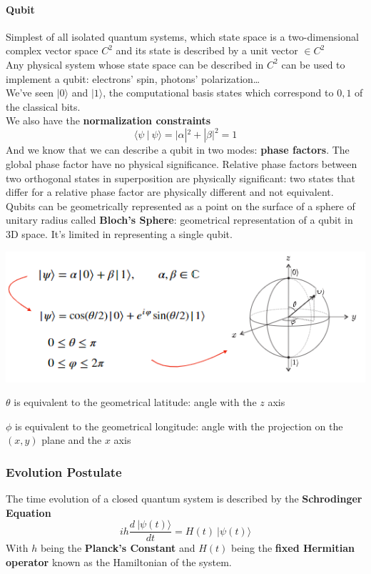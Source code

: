 \documentclass[10pt]{report}
\begin{document}
\paragraph{Qubit} Simplest of all isolated quantum systems, which state space is a two-dimensional complex vector space $C^2$ and its state is described by a unit vector $\in C^2$\\
Any physical system whose state space can be described in $C^2$ can be used to implement a qubit: electrons' spin, photons' polarization\ldots\\
We've seen $|0\rangle$ and $|1\rangle$, the computational basis states which correspond to $0,1$ of the classical bits.\\
We also have the \textbf{normalization constraints} $$\langle\psi\:|\:\psi\rangle = |\alpha|^2+|\beta|^2 = 1$$
And we know that we can describe a qubit in two modes: \textbf{phase factors}. The global phase factor have no physical significance. Relative phase factors between two orthogonal states in superposition are physically significant: two states that differ for a relative phase factor are physically different and not equivalent.\\
Qubits can be geometrically represented as a point on the surface of a sphere of unitary radius called \textbf{Bloch's Sphere}: geometrical representation of a qubit in 3D space. It's limited in representing a single qubit.
\begin{center}
	\includegraphics[scale=0.75]{13.png}
\end{center}
\begin{list}{}{}
	\item $\theta$ is equivalent to the geometrical latitude: angle with the $z$ axis
	\item $\phi$ is equivalent to the geometrical longitude: angle with the projection on the $(x,y)$ plane and the $x$ axis
\end{list}
\subsubsection{Evolution Postulate}
The time evolution of a closed quantum system is described by the \textbf{Schrodinger Equation} $$ih\frac{d\:|\psi(t)\rangle}{dt} = H(t)\:|\psi(t)\rangle$$
With $h$ being the \textbf{Planck's Constant} and $H(t)$ being the \textbf{fixed Hermitian operator} known as the Hamiltonian of the system.
\end{document}
